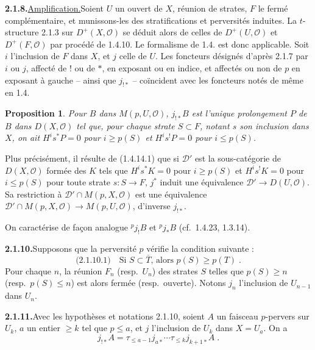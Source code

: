 \documentclass[12pt,a4paper]{article}
\theoremstyle{plain}
\newtheorem{proposition}[theorem]{Proposition}
\theoremstyle{definition}
\begin{document}
\smallskip
\noindent\textbf{2.1.8.}\quad \underline{Amplification.}\quad Soient $U$ un ouvert de $X$, r\'eunion de strates, $F$ le ferm\'e compl\'ementaire, et munissons-les des stratifications et perversit\'es induites. La $t$-structure 2.1.3 sur $D^+(X, \mathcal{O})$ se d\'eduit alors de celles de $D^+(U, \mathcal{O})$ et $D^+(F, \mathcal{O})$ par proc\'ed\'e de 1.4.10. Le formalisme de 1.4. est donc applicable. Soit $i$ l'inclusion de $F$ dans $X$, et $j$ celle de $U$. Les foncteurs d\'esign\'es d'apr\`es 2.1.7 par $i$ ou $j$, affect\'e de $!$ ou de $*$, en exposant ou en indice, et affect\'es ou non de $p$ en exposant \`a gauche -- ainsi que $j_{!*}$ -- co\"incident avec les foncteurs not\'es de m\^eme en 1.4.

\begin{proposition}\label{prop:2.1.9}
Pour $B$ dans $M(p, U, \mathcal{O})$, $j_{!*} B$ est l'unique prolongement $P$ de $B$ dans $D(X, \mathcal{O})$ tel que, pour chaque strate $S \subset F$, notant $s$ son inclusion dans $X$, on ait $H^i s^* P = 0$ pour $i \geqslant p(S)$ et $H^i s^! P = 0$ pour $i \leqslant p(S)$.
\end{proposition}

Plus pr\'ecis\'ement, il r\'esulte de (1.4.14.1) que si $\mathcal{D}'$ est la sous-cat\'egorie de $D(X, \mathcal{O})$ form\'ee des $K$ tels que $H^i s^* K = 0$ pour $i \geqslant p(S)$ et $H^i s^! K = 0$ pour $i \leqslant p(S)$ pour toute strate $s : S \to F$, $j^*$ induit une \'equivalence $\mathcal{D}' \to D(U, \mathcal{O})$. Sa restriction \`a $\mathcal{D}' \cap M(p, X, \mathcal{O})$ est une \'equivalence $\mathcal{D}' \cap M(p, X, \mathcal{O}) \to M(p, U, \mathcal{O})$, d'inverse $j_{!*}$.

On caract\'erise de fa\c{c}on analogue ${}^p j_! B$ et ${}^p j_* B$ (cf.~1.4.23, 1.3.14).

\smallskip
\noindent\textbf{2.1.10.}\quad Supposons que la perversit\'e $p$ v\'erifie la condition suivante :
\[
\text{(2.1.10.1)}\quad\text{Si } S \subset \overline{T}\text{, alors } p(S) \geqslant p(T)\;.
\]
Pour chaque $n$, la r\'eunion $F_n$ (resp.\ $U_n$) des strates $S$ telles que $p(S) \geqslant n$ (resp.\ $p(S) \leqslant n$) est alors ferm\'ee (resp.\ ouverte). Notons $j_n$ l'inclusion de $U_{n-1}$ dans $U_n$.

\smallskip
\noindent\textbf{2.1.11.}\quad Avec les hypoth\`eses et notations 2.1.10, soient $A$ un faisceau $p$-pervers sur $U_k$, $a$ un entier $\geqslant k$ tel que $p \leqslant a$, et $j$ l'inclusion de $U_k$ dans $X = U_a$. On a
\[
j_{!*} A = \tau_{\leqslant a-1} j_{a*} \cdots \tau_{\leqslant k} j_{k+1*} A\;.
\]
\end{document}
